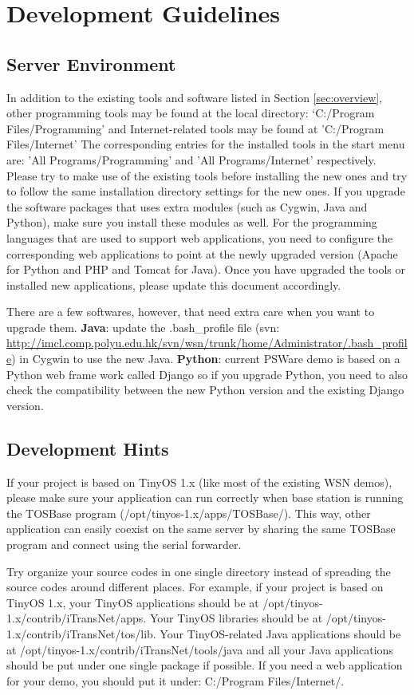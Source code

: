 \section{Development Guidelines}
\subsection{Server Environment}
\label{sec:environment}
In addition to the existing tools and software listed in Section \ref{sec:overview}, other programming tools may be found at the local directory: `C:/Program Files/Programming' and Internet-related tools may be found at 'C:/Program Files/Internet'
The corresponding entries for the installed tools in the start menu are: 'All Programs/Programming' and 'All Programs/Internet' respectively. Please try to make use of the existing tools before installing the new ones and try to follow the same installation directory settings for the new ones. If you upgrade the software packages that uses extra modules (such as Cygwin, Java and Python), make sure you install these modules as well. For the programming languages that are used to support web applications, you need to configure the corresponding web applications to point at the newly upgraded version (Apache for Python and PHP and Tomcat for Java). Once you have upgraded the tools or installed new applications, please update this document accordingly.

There are a few softwares, however, that need extra care when you want to upgrade them. \textbf{Java}: update the .bash\_profile file (svn: \url{http://imcl.comp.polyu.edu.hk/svn/wsn/trunk/home/Administrator/.bash_profile}) in Cygwin to use the new Java. \textbf{Python}: current PSWare demo is based on a Python web frame work called Django so if you upgrade Python, you need to also check the compatibility between the new Python version and the existing Django version.

\subsection{Development Hints}
\label{sec:hints}
If your project is based on TinyOS 1.x (like most of the existing WSN demos), please make sure your application can run correctly when base station is running the TOSBase program (/opt/tinyos-1.x/apps/TOSBase/). This way, other application can easily coexist on the same server by sharing the same TOSBase program and connect using the serial forwarder.

Try organize your source codes in one single directory instead of spreading the source codes around different places. For example, if your project is based on TinyOS 1.x, your TinyOS applications should be at /opt/tinyos-1.x/contrib/iTransNet/apps. Your TinyOS libraries should be at /opt/tinyos-1.x/contrib/iTransNet/tos/lib. Your TinyOS-related Java applications should be at /opt/tinyos-1.x/contrib/iTransNet/tools/java and all your Java applications should be put under one single package if possible. If you need a web application for your demo, you should put it under: C:/Program Files/Internet/. 

